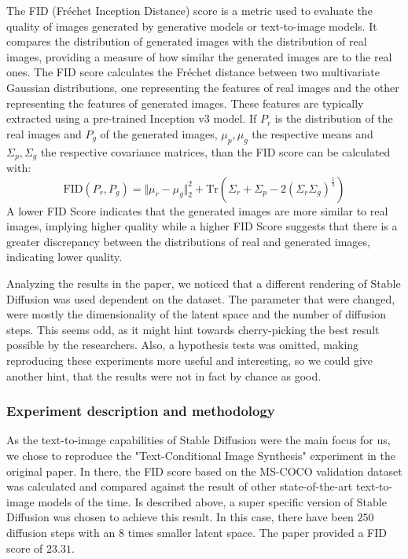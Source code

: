 \documentclass[11pt]{article}
\begin{document}
The FID (Fréchet Inception Distance)\cite{heusel2018ganstrainedtimescaleupdate} score is a metric used to evaluate the quality of images generated by generative models or text-to-image models. It compares the distribution of generated images with the distribution of real images, providing a measure of how similar the generated images are to the real ones. The FID score calculates the Fréchet distance between two multivariate Gaussian distributions, one representing the features of real images and the other representing the features of generated images. These features are typically extracted using a pre-trained Inception v3 model. If $P_r$ is the distribution of the real images and $P_g$ of the generated images, $\mu_p, \mu_g$ the respective means and $\Sigma_p, \Sigma_g$ the respective covariance matrices, than the FID score can be calculated with:
$$\mathrm{FID}(P_r, P_g) = \Vert\mu_r - \mu_g\Vert_2^2 + \mathrm{Tr}\left(\Sigma_r + \Sigma_p - 2 (\Sigma_r\Sigma_g)^\frac{1}{2}\right)$$
A lower FID Score indicates that the generated images are more similar to real images, implying higher quality while a higher FID Score suggests that there is a greater discrepancy between the distributions of real and generated images, indicating lower quality.

Analyzing the results in the paper, we noticed that a different rendering of Stable Diffusion was used dependent on the dataset. The parameter that were changed, were mostly the dimensionality of the latent space and the number of diffusion steps. This seems odd, as it might hint towards cherry-picking the best result possible by the researchers. Also, a hypothesis tests was omitted, making reproducing these experiments more useful and interesting, so we could give another hint, that the results were not in fact by chance as good.

\subsubsection{Experiment description and methodology}
As the text-to-image capabilities of Stable Diffusion were the main focus for us, we chose to reproduce the "Text-Conditional Image Synthesis" experiment in the original paper. In there, the FID score based on the MS-COCO validation dataset\cite{lin2015microsoftcococommonobjects} was calculated and compared against the result of other state-of-the-art text-to-image models of the time. Is described above, a super specific version of Stable Diffusion was chosen to achieve this result. In this case, there have been $250$ diffusion steps with an $8$ times smaller latent space. The paper provided a FID score of $23.31$.
\end{document}
